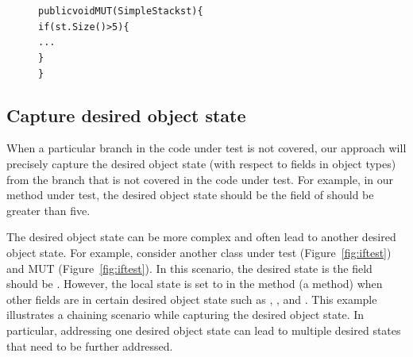 \begin{figure}[t]
\begin{CodeOut}
\begin{alltt}
\hspace*{0.2in}public void MUT(SimpleStack st) \{
\hspace*{0.3in}if (st.Size() > 5) \{
\hspace*{0.4in}...
\hspace*{0.2in}\}
\}
\end{alltt}
\end{CodeOut}\vspace*{-3ex}
\vspace*{-3ex}
\end{figure}

\subsection{Capture desired object state}

When a particular branch in the code under test is not covered, our approach will precisely capture the desired object state (with respect to fields in object types) from the branch that is not covered in the code under test. For example, in our method under test, the desired object state should be the field  of  should be greater than five. 

The desired object state can be more complex and often lead to another desired object state. For example, consider another class under test  (Figure~\ref{fig:iftest}) and MUT (Figure~\ref{fig:iftest}). In this scenario, the desired state is the field  should be . However, the local state is set to  in the method  (a  method) when other fields are in certain desired object state such as , , and . This example illustrates a chaining scenario while capturing the desired object state. In particular, addressing one desired object state can lead to multiple desired states that need to be further addressed.

